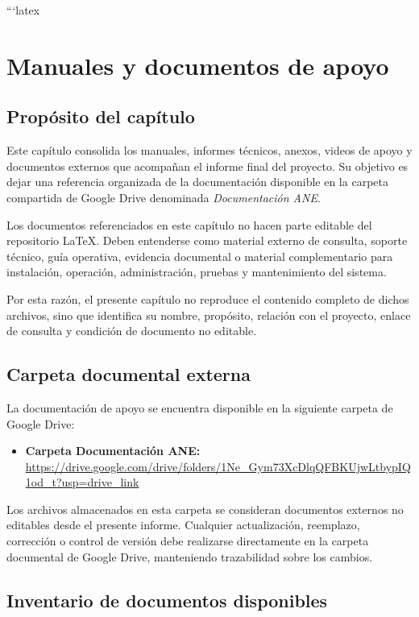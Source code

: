 ```latex
\chapter{Manuales y documentos de apoyo}

\section{Propósito del capítulo}

Este capítulo consolida los manuales, informes técnicos, anexos, videos de apoyo y documentos externos que acompañan el informe final del proyecto. Su objetivo es dejar una referencia organizada de la documentación disponible en la carpeta compartida de Google Drive denominada \textit{Documentación ANE}.

Los documentos referenciados en este capítulo no hacen parte editable del repositorio \LaTeX. Deben entenderse como material externo de consulta, soporte técnico, guía operativa, evidencia documental o material complementario para instalación, operación, administración, pruebas y mantenimiento del sistema.

Por esta razón, el presente capítulo no reproduce el contenido completo de dichos archivos, sino que identifica su nombre, propósito, relación con el proyecto, enlace de consulta y condición de documento no editable.

\section{Carpeta documental externa}

La documentación de apoyo se encuentra disponible en la siguiente carpeta de Google Drive:

\begin{itemize}
    \item \textbf{Carpeta Documentación ANE:} \url{https://drive.google.com/drive/folders/1Ne_Gym73XcDlqQFBKUjwLtbypIQ1od_t?usp=drive_link}
\end{itemize}

Los archivos almacenados en esta carpeta se consideran documentos externos no editables desde el presente informe. Cualquier actualización, reemplazo, corrección o control de versión debe realizarse directamente en la carpeta documental de Google Drive, manteniendo trazabilidad sobre los cambios.

\section{Inventario de documentos disponibles}

